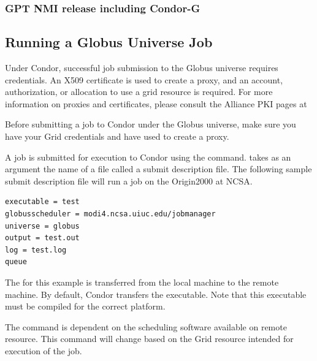 \subsubsection{\label{sec:Condor-G-GPTNMI}GPT NMI release including Condor-G}
\Todo

\subsection{\label{sec:Running-CondorG-Job}Running a Globus Universe Job}

Under Condor, successful job submission to the Globus universe requires
credentials.
An X509 certificate is used to create a proxy,
and an account, authorization, or allocation to use a grid resource
is required.
For more information on proxies and certificates,
please consult the Alliance PKI pages at 


Before submitting a job to Condor under the Globus universe,
make sure you have your Grid 
credentials and have used  to create a proxy.

A job is submitted for execution to Condor using the
 command.
 takes as an argument
the name of a file called a submit description file.
The following sample submit description file will run a job on
the Origin2000 at NCSA.

\begin{verbatim}
executable = test
globusscheduler = modi4.ncsa.uiuc.edu/jobmanager
universe = globus
output = test.out
log = test.log
queue
\end{verbatim} 

The 
for this example is
transferred from the local machine to the remote machine.
By default, Condor transfers the executable.
Note that this executable must be compiled for the correct
platform.

The  command is dependent on the
scheduling software available on remote resource.
This command will change based on the Grid resource
intended for execution of the job.

